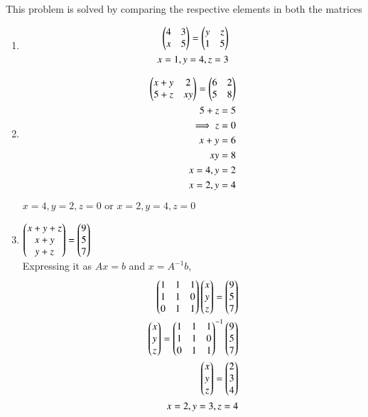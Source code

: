 %
This problem is solved by comparing the respective elements in both the matrices
\begin{enumerate}
\item 
\begin{align}
\begin{pmatrix}4&3\\x&5\end{pmatrix} = \begin{pmatrix}y&z\\1&5\end{pmatrix}
\\
x=1, y=4, z=3
\end{align}

\item 
\begin{align}
\begin{pmatrix}x+y&2\\5+z&xy\end{pmatrix} = \begin{pmatrix}6&2\\5&8\end{pmatrix}
\\
5+z = 5
\\
\implies z=0
\\
x+y=6
\\
xy=8
\\
x=4,y=2 
\\
x=2,y=4
\end{align}
$x=4, y=2, z=0$ or $x=2, y=4, z=0$ 

\item $\begin{pmatrix}x+y+z\\x+y\\y+z\end{pmatrix} = \begin{pmatrix}9\\5\\7\end{pmatrix}$ \\
Expressing it as $Ax = b$ and $x = A^{-1}b$,
\begin{align}
\begin{pmatrix}1&1&1\\1&1&0\\0&1&1\end{pmatrix}\begin{pmatrix}x\\y\\z\end{pmatrix} = \begin{pmatrix}9\\5\\7\end{pmatrix}
\\
\begin{pmatrix}x\\y\\z\end{pmatrix} = \begin{pmatrix}1&1&1\\1&1&0\\0&1&1\end{pmatrix}^{-1}\begin{pmatrix}9\\5\\7\end{pmatrix}
\\
\begin{pmatrix}x\\y\\z\end{pmatrix} = \begin{pmatrix}2\\3\\4\end{pmatrix}
\\
x=2, y=3, z=4
\end{align}

\end{enumerate}
